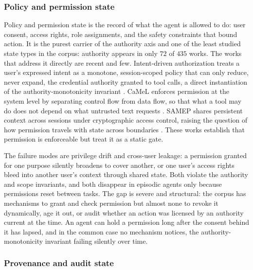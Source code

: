 \subsubsection{Policy and permission state}

Policy and permission state is the record of what the agent is allowed to do: user consent, access rights, role assignments, and the safety constraints that bound action. It is the purest carrier of the authority axis and one of the least studied state types in the corpus: authority appears in only $72$ of $435$ works. The works that address it directly are recent and few. Intent-driven authorization treats a user's expressed intent as a monotone, session-scoped policy that can only reduce, never expand, the credential authority granted to tool calls, a direct instantiation of the authority-monotonicity invariant \citep{zhu2026intentgovernedauth}. CaMeL enforces permission at the system level by separating control flow from data flow, so that what a tool may do does not depend on what untrusted text requests \citep{debenedetti2025camel}. SAMEP shares persistent context across sessions under cryptographic access control, raising the question of how permission travels with state across boundaries \citep{masoor2025samep}. These works establish that permission is enforceable but treat it as a static gate.

The failure modes are privilege drift and cross-user leakage: a permission granted for one purpose silently broadens to cover another, or one user's access rights bleed into another user's context through shared state. Both violate the authority and scope invariants, and both disappear in episodic agents only because permissions reset between tasks. The gap is severe and structural: the corpus has mechanisms to grant and check permission but almost none to revoke it dynamically, age it out, or audit whether an action was licensed by an authority current at the time. An agent can hold a permission long after the consent behind it has lapsed, and in the common case no mechanism notices, the authority-monotonicity invariant failing silently over time.

\subsubsection{Provenance and audit state}

